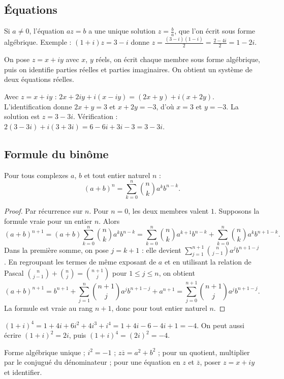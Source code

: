 \subsection{Équations}
\begin{method}
Si $a\neq0$, l'équation $az=b$ a une unique solution $z=\frac ba$, que l'on écrit sous forme algébrique. Exemple : $(1+i)z=3-i$ donne $z=\frac{(3-i)(1-i)}{2}=\frac{2-4i}{2}=1-2i$.
\end{method}
\begin{method}
On pose $z=x+iy$ avec $x$, $y$ réels, on écrit chaque membre sous forme algébrique, puis on identifie parties réelles et parties imaginaires. On obtient un système de deux équations réelles.
\end{method}
\begin{example}[Résoudre $2z+i\overline z=3-3i$]
Avec $z=x+iy$ : $2x+2iy+i(x-iy)=(2x+y)+i(x+2y)$. L'identification donne $2x+y=3$ et $x+2y=-3$, d'où $x=3$ et $y=-3$. La solution est $z=3-3i$. Vérification : $2(3-3i)+i(3+3i)=6-6i+3i-3=3-3i$.
\end{example}

\subsection{Formule du binôme}
\begin{theorem}
Pour tous complexes $a$, $b$ et tout entier naturel $n$ :
\[(a+b)^n=\sum_{k=0}^{n}\binom nk a^kb^{n-k}.\]
\end{theorem}
\begin{proof}
Par récurrence sur $n$. Pour $n=0$, les deux membres valent $1$. Supposons la formule vraie pour un entier $n$. Alors
\[(a+b)^{n+1}=(a+b)\sum_{k=0}^{n}\binom nk a^kb^{n-k}=\sum_{k=0}^{n}\binom nk a^{k+1}b^{n-k}+\sum_{k=0}^{n}\binom nk a^kb^{n+1-k}.\]
Dans la première somme, on pose $j=k+1$ : elle devient $\sum_{j=1}^{n+1}\binom n{j-1}a^jb^{n+1-j}$. En regroupant les termes de même exposant de $a$ et en utilisant la relation de Pascal $\binom n{j-1}+\binom nj=\binom{n+1}j$ pour $1\le j\le n$, on obtient
\[(a+b)^{n+1}=b^{n+1}+\sum_{j=1}^{n}\binom{n+1}j a^jb^{n+1-j}+a^{n+1}=\sum_{j=0}^{n+1}\binom{n+1}j a^jb^{n+1-j}.\]
La formule est vraie au rang $n+1$, donc pour tout entier naturel $n$.
\end{proof}
\begin{example}
$(1+i)^4=1+4i+6i^2+4i^3+i^4=1+4i-6-4i+1=-4$. On peut aussi écrire $(1+i)^2=2i$, puis $(1+i)^4=(2i)^2=-4$.
\end{example}
\begin{keypoint}[À retenir]
Forme algébrique unique ; $i^2=-1$ ; $z\overline z=a^2+b^2$ ; pour un quotient, multiplier par le conjugué du dénominateur ; pour une équation en $z$ et $\overline z$, poser $z=x+iy$ et identifier.
\end{keypoint}

